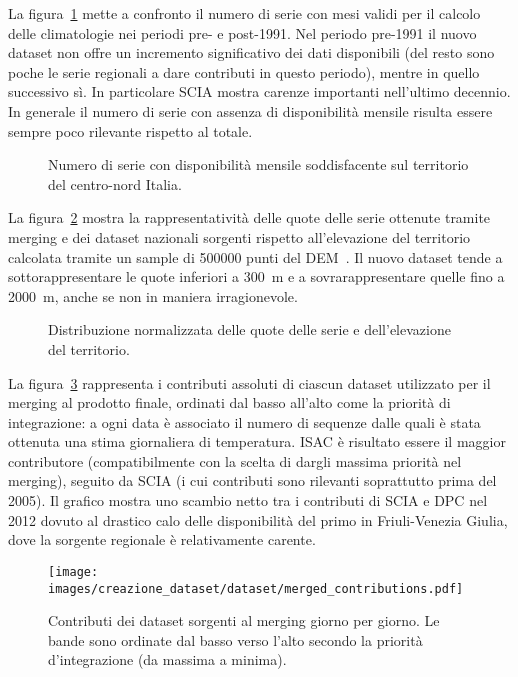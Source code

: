 La figura~\ref{fig:merged-timeseries} mette a confronto il numero di serie con mesi validi per il calcolo delle climatologie nei periodi pre- e post-1991. Nel periodo pre-1991 il nuovo dataset non offre un incremento significativo dei dati disponibili (del resto sono poche le serie regionali a dare contributi in questo periodo), mentre in quello successivo sì. In particolare SCIA mostra carenze importanti nell'ultimo decennio. In generale il numero di serie con assenza di disponibilità mensile risulta essere sempre poco rilevante rispetto al totale.
\begin{figure}[ht]
  \centering
  
  \caption{Numero di serie con disponibilità mensile soddisfacente sul territorio del centro-nord Italia.}\label{fig:merged-timeseries}
\end{figure}

La figura~\ref{fig:merged-elevations} mostra la rappresentatività delle quote delle serie ottenute tramite merging e dei dataset nazionali sorgenti rispetto all'elevazione del territorio calcolata tramite un sample di \num{500000} punti del DEM~\cite{europeanspaceagencyCopernicusGlobalEuropean2022}. Il nuovo dataset tende a sottorappresentare le quote inferiori a \qty{300}{\meter} e a sovrarappresentare quelle fino a \qty{2000}{\meter}, anche se non in maniera irragionevole.
\begin{figure}[ht]
  \centering
  
  \caption{Distribuzione normalizzata delle quote delle serie e dell'elevazione del territorio.}\label{fig:merged-elevations}
\end{figure}

La figura~\ref{fig:merged-contributions} rappresenta i contributi assoluti di ciascun dataset utilizzato per il merging al prodotto finale, ordinati dal basso all'alto come la priorità di integrazione: a ogni data è associato il numero di sequenze dalle quali è stata ottenuta una stima giornaliera di temperatura. ISAC è risultato essere il maggior contributore (compatibilmente con la scelta di dargli massima priorità nel merging), seguito da SCIA (i cui contributi sono rilevanti soprattutto prima del 2005). Il grafico mostra uno scambio netto tra i contributi di SCIA e DPC nel 2012 dovuto al drastico calo delle disponibilità del primo in Friuli-Venezia Giulia, dove la sorgente regionale è relativamente carente.
\begin{figure}[ht]
  \centering
  \texttt{[image: images/creazione\_dataset/dataset/merged\_contributions.pdf]}
  \caption{Contributi dei dataset sorgenti al merging giorno per giorno. Le bande sono ordinate dal basso verso l'alto secondo la priorità d'integrazione (da massima a minima).}\label{fig:merged-contributions}
\end{figure}

